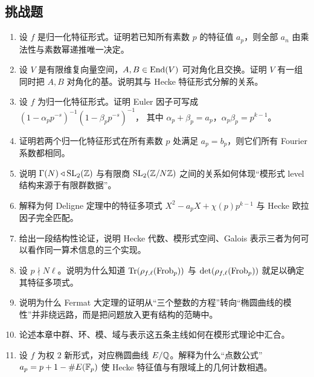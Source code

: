\subsection*{挑战题}
\begin{enumerate}[resume, label=\textbf{\arabic*.}, leftmargin=*, itemsep=0.5em]
\item \hard 设 $f$ 是归一化特征形式。证明若已知所有素数 $p$ 的特征值 $a_p$，则全部 $a_n$ 由乘法性与素数幂递推唯一决定。
\item \hard 设 $V$ 是有限维复向量空间，$A,B\in\mathrm{End}(V)$ 可对角化且交换。证明 $V$ 有一组同时把 $A,B$ 对角化的基。说明其与 Hecke 特征形式分解的关系。
\item \hard 设 $f$ 为归一化特征形式。证明 Euler 因子可写成
$(1-\alpha_pp^{-s})^{-1}(1-\beta_pp^{-s})^{-1}$，
其中 $\alpha_p+\beta_p=a_p$，$\alpha_p\beta_p=p^{k-1}$。
\item \hard 证明若两个归一化特征形式在所有素数 $p$ 处满足 $a_p=b_p$，则它们所有 Fourier 系数都相同。
\item \hard 说明 $\Gamma(N)\triangleleft \mathrm{SL}_2(\mathbb{Z})$ 与有限商 $\mathrm{SL}_2(\mathbb{Z}/N\mathbb{Z})$ 之间的关系如何体现“模形式 level 结构来源于有限群数据”。
\item \hard 解释为何 Deligne 定理中的特征多项式
$X^2-a_pX+\chi(p)p^{k-1}$
与 Hecke 欧拉因子完全匹配。
\item \hard 给出一段结构性论证，说明 Hecke 代数、模形式空间、Galois 表示三者为何可以看作同一算术信息的三个实现。
\item \hard 设 $p\nmid N\ell$。说明为什么知道
$\mathrm{Tr}(\rho_{f,\ell}(\mathrm{Frob}_p))$ 与
$\det(\rho_{f,\ell}(\mathrm{Frob}_p))$
就足以确定其特征多项式。
\item \hard 说明为什么 Fermat 大定理的证明从“三个整数的方程”转向“椭圆曲线的模性”并非绕远路，而是把问题放入更有结构的范畴中。
\item \hard 论述本章中群、环、模、域与表示这五条主线如何在模形式理论中汇合。
\item \hard 设 $f$ 为权 $2$ 新形式，对应椭圆曲线 $E/\mathbb{Q}$。解释为什么“点数公式”
$a_p=p+1-\#E(\mathbb{F}_p)$
使 Hecke 特征值与有限域上的几何计数相遇。
\end{enumerate}
